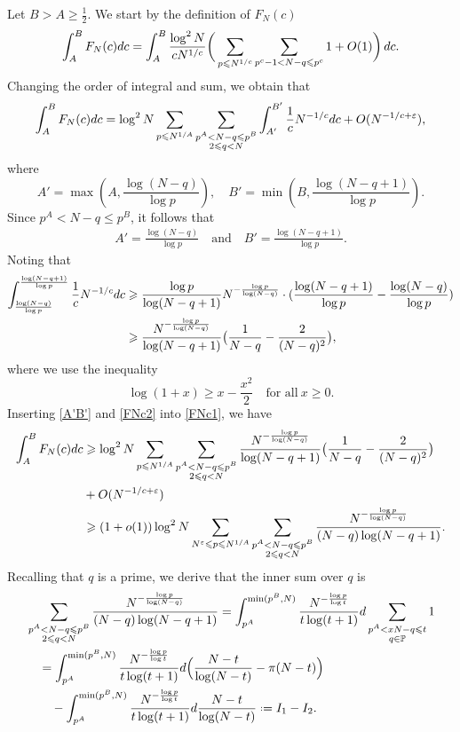 \documentclass[12pt, reqno, twoside, letterpaper]{amsart}
\numberwithin{equation}{section}
\newcommand{\PP}{\ensuremath{\mathbb{P}}}
\theoremstyle{customthm}
\theoremstyle{customrem}
\newcommand*{\defeq}{\mathrel{\vcenter{\baselineskip0.5ex \lineskiplimit0pt
			\hbox{\scriptsize.}\hbox{\scriptsize.}}}%
	=}
\def\int{\intop\nolimits}
\begin{document}
Let $B>A\geqslant \frac{1}{2}$. We start by the definition of $F_N(c)$
$$
\int_{A}^{B}F_N(c)dc = \int_{A}^{B}\frac{\log ^2N}{cN^{1/c}}\bigg(\sum_{p\leqslant N^{1/c}}\sum_{p^c-1<N-q\leqslant p^c}1 +O(1) \bigg)\,dc.
$$
Changing the order of integral and sum, we obtain that
\begin{align}
	\label{FNc1}
\int_{A}^{B}F_N(c)dc = \log^2 N \sum_{p \leqslant N^{1/A}} \sum_{\substack{p^A < N-q \leqslant p^B \\ 2 \leqslant q < N}} \int_{A'}^{B'} \frac{1}{c}N^{-1/c} dc  + O(N^{-1/c+\varepsilon}),
\end{align}
where 
$$
A' = \max(A,\frac{\log(N-q)}{\log p}), \quad B' = \min(B,\frac{\log(N-q+1)}{\log p}).
$$
Since $p^A < N-q \leqslant p^B$, it follows that
\begin{align}
	\label{A'B'}
A' = \frac{\log(N-q)}{\log p} \quad \text{and} \quad B' = \frac{\log(N-q+1)}{\log p}.
\end{align}
Noting that
\begin{align}
	\label{FNc2}
\nonumber \int_{\frac{\log(N-q)}{\log p}}^{\frac{\log(N-q+1)}{\log p}} \frac{1}{c}N^{-1/c} dc &\geqslant \frac{\log p}{\log(N-q+1)} N^{-\frac{\log p}{\log(N-q)}} \cdot ( \frac{\log (N-q+1)}{\log p} - \frac{\log(N-q)}{\log p}) \\
 &\geqslant \frac{N^{-\frac{\log p}{\log(N-q)}}}{\log(N-q+1)}\big(\frac{1}{N-q} - \frac{2}{(N-q)^2}\big),
\end{align}
where we use the inequality
$$
\log (1+x) \geqslant x - \frac{x^2}{2} \quad \text{for all}\ x \geqslant 0.
$$
Inserting \eqref{A'B'} and \eqref{FNc2} into \eqref{FNc1}, we have
\begin{align}
	\label{FNc3}
\nonumber \int_{A}^{B}F_N(c)dc &\geqslant \log^2 N \sum_{p \leqslant N^{1/A}} \sum_{\substack{p^A < N-q \leqslant p^B \\ 2 \leqslant q < N}} \frac{N^{-\frac{\log p}{\log(N-q)}}}{\log(N-q+1)}\big(\frac{1}{N-q} - \frac{2}{(N-q)^2}\big)  \\
\nonumber &+ O(N^{-1/c+\varepsilon}) \\
&\geqslant (1+o(1))\log^2 N \sum_{N^{\varepsilon} \leqslant p \leqslant N^{1/A}} \sum_{\substack{p^A < N-q \leqslant p^B \\ 2 \leqslant q < N}} \frac{N^{-\frac{\log p}{\log(N-q)}}}{(N-q)\log(N-q+1)}.
\end{align}
Recalling that $q$ is a prime, we derive that the inner sum over $q$ is
\begin{align}
	\label{FNc4}
\nonumber&\sum_{\substack{p^A < N-q \leqslant p^B \\ 2 \leqslant q < N}} \frac{N^{-\frac{\log p}{\log(N-q)}}}{(N-q)\log(N-q+1)} = \int_{p^A}^{\min(p^B,N)} \frac{N^{-\frac{\log p}{\log t}}}{t\log (t+1)} d\sum_{\substack{p^A < x N-q \leqslant t \\ q \in \PP}}1 \\
\nonumber&\quad = \int_{p^A}^{\min(p^B,N)} \frac{N^{-\frac{\log p}{\log t}}}{t\log (t+1)} d\Big( \frac{N-t}{\log (N-t)} - \pi(N-t)\Big) \\
&\qquad - \int_{p^A}^{\min(p^B,N)} \frac{N^{-\frac{\log p}{\log t}}}{t\log (t+1)} d\frac{N-t}{\log (N-t)} \defeq I_1 - I_2.
\end{align}
\end{document}
